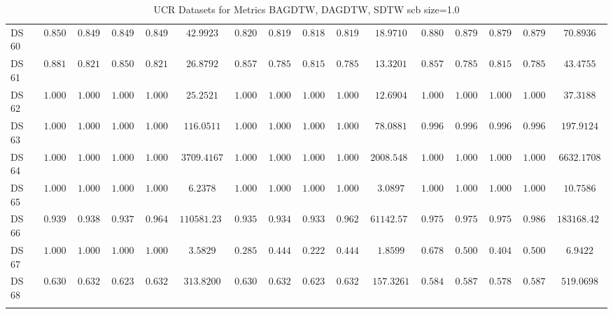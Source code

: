 {\begin{longtable}{|l|ccccc|ccccc|ccccc|}
		DS 60 & $0.8507$ & $0.8498$ & $0.8499$ & $0.8498$ & $42.9923$ & $0.8209$ & $0.8195$ & $0.8189$ & $0.8195$ & $18.9710$ & $\boldsymbol{0.8806}$ & $\boldsymbol{0.8792}$ & $\boldsymbol{0.8793}$ & $\boldsymbol{0.8792}$ & $70.8936$ \\
		DS 61 & $\boldsymbol{0.8810}$ & $\boldsymbol{0.8214}$ & $\boldsymbol{0.8503}$ & $\boldsymbol{0.8214}$ & $26.8792$ & $0.8571$ & $0.7857$ & $0.8152$ & $0.7857$ & $13.3201$ & $0.8571$ & $0.7857$ & $0.8152$ & $0.7857$ & $43.4755$ \\
		DS 62 & $1.0000$ & $1.0000$ & $1.0000$ & $1.0000$ & $25.2521$ & $1.0000$ & $1.0000$ & $1.0000$ & $1.0000$ & $12.6904$ & $\boldsymbol{1.0000}$ & $\boldsymbol{1.0000}$ & $\boldsymbol{1.0000}$ & $\boldsymbol{1.0000}$ & $37.3188$ \\
		DS 63 & $1.0000$ & $1.0000$ & $1.0000$ & $1.0000$ & $116.0511$ & $\boldsymbol{1.0000}$ & $\boldsymbol{1.0000}$ & $\boldsymbol{1.0000}$ & $\boldsymbol{1.0000}$ & $78.0881$ & $0.9966$ & $0.9966$ & $0.9966$ & $0.9966$ & $197.9124$ \\
		DS 64 & $1.0000$ & $1.0000$ & $1.0000$ & $1.0000$ & $3709.4167$ & $1.0000$ & $1.0000$ & $1.0000$ & $1.0000$ & $2008.5487$ & $\boldsymbol{1.0000}$ & $\boldsymbol{1.0000}$ & $\boldsymbol{1.0000}$ & $\boldsymbol{1.0000}$ & $6632.1708$ \\
		DS 65 & $1.0000$ & $1.0000$ & $1.0000$ & $1.0000$ & $6.2378$ & $1.0000$ & $1.0000$ & $1.0000$ & $1.0000$ & $3.0897$ & $\boldsymbol{1.0000}$ & $\boldsymbol{1.0000}$ & $\boldsymbol{1.0000}$ & $\boldsymbol{1.0000}$ & $10.7586$ \\
		DS 66 & $0.9393$ & $0.9380$ & $0.9377$ & $0.9646$ & $110581.2394$ & $0.9357$ & $0.9343$ & $0.9337$ & $0.9624$ & $61142.5727$ & $\boldsymbol{0.9759}$ & $\boldsymbol{0.9757}$ & $\boldsymbol{0.9759}$ & $\boldsymbol{0.9861}$ & $183168.4278$ \\
		DS 67 & $1.0000$ & $1.0000$ & $1.0000$ & $1.0000$ & $3.5829$ & $0.2857$ & $0.4444$ & $0.2222$ & $0.4444$ & $1.8599$ & $0.6786$ & $0.5000$ & $0.4043$ & $0.5000$ & $6.9422$ \\
		DS 68 & $0.6308$ & $0.6325$ & $0.6236$ & $0.6325$ & $313.8200$ & $\boldsymbol{0.6308}$ & $\boldsymbol{0.6325}$ & $\boldsymbol{0.6236}$ & $\boldsymbol{0.6325}$ & $157.3261$ & $0.5846$ & $0.5875$ & $0.5782$ & $0.5875$ & $519.0698$ \\
		\hline
		\caption{UCR Datasets for Metrics BAGDTW, DAGDTW, SDTW \gls{scb} size=1.0}
		\label{tab:UCR_bagdtw-dagdtw-sdtw_scb_size=1.0}
	\end{longtable}
}
